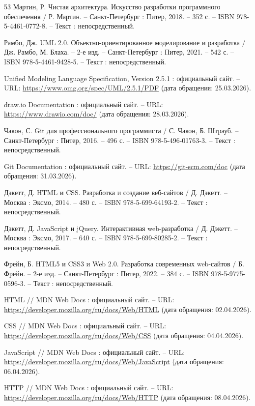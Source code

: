 \begin{thebibliography}{53}
	Мартин, Р. Чистая архитектура. Искусство разработки программного обеспечения / Р. Мартин. – Санкт-Петербург : Питер, 2018. – 352 с. – ISBN 978-5-4461-0772-8. – Текст : непосредственный.
	
	Рамбо, Дж. UML 2.0. Объектно-ориентированное моделирование и разработка / Дж. Рамбо, М. Блаха. – 2-е изд. – Санкт-Петербург : Питер, 2021. – 542 с. – ISBN 978-5-4461-9428-5. – Текст : непосредственный.
	
	Unified Modeling Language Specification, Version 2.5.1 : официальный сайт. – URL: \url{https://www.omg.org/spec/UML/2.5.1/PDF} (дата обращения: 25.03.2026).
	
	draw.io Documentation : официальный сайт. – URL: \url{https://www.drawio.com/doc/} (дата обращения: 28.03.2026).
	
	Чакон, С. Git для профессионального программиста / С. Чакон, Б. Штрауб. – Санкт-Петербург : Питер, 2016. – 496 с. – ISBN 978-5-496-01763-3. – Текст : непосредственный.
	
	Git Documentation : официальный сайт. – URL: \url{https://git-scm.com/doc} (дата обращения: 31.03.2026).
	
	Дэкетт, Д. HTML и CSS. Разработка и создание веб-сайтов / Д. Дэкетт. – Москва : Эксмо, 2014. – 480 с. – ISBN 978-5-699-64193-2. – Текст : непосредственный.
	
	Дэкетт, Д. JavaScript и jQuery. Интерактивная web-разработка / Д. Дэкетт. – Москва : Эксмо, 2017. – 640 с. – ISBN 978-5-699-80285-2. – Текст : непосредственный.
	
	Фрейн, Б. HTML5 и CSS3 и Web 2.0. Разработка современных web-сайтов / Б. Фрейн. – 2-е изд. – Санкт-Петербург : Питер, 2022. – 384 с. – ISBN 978-5-9775-0596-3. – Текст : непосредственный.
	
	HTML // MDN Web Docs : официальный сайт. – URL: \url{https://developer.mozilla.org/ru/docs/Web/HTML} (дата обращения: 02.04.2026).
	
	CSS // MDN Web Docs : официальный сайт. – URL: \url{https://developer.mozilla.org/ru/docs/Web/CSS} (дата обращения: 04.04.2026).
	
	JavaScript // MDN Web Docs : официальный сайт. – URL: \url{https://developer.mozilla.org/ru/docs/Web/JavaScript} (дата обращения: 06.04.2026).
	
	HTTP // MDN Web Docs : официальный сайт. – URL: \url{https://developer.mozilla.org/ru/docs/Web/HTTP} (дата обращения: 08.04.2026).
	

\end{thebibliography}
